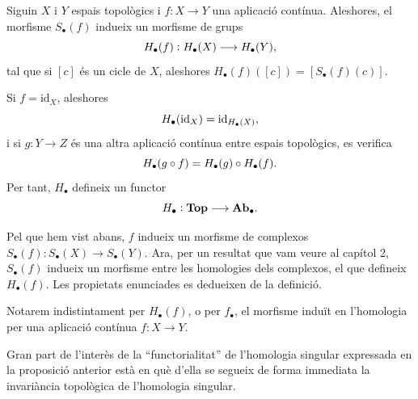\documentclass[../main.tex]{subfiles}
\begin{document}
\begin{prop}
Siguin $X$ i $Y$ espais topològics i $f:X\rightarrow Y$ una aplicació contínua. Aleshores, el morfisme $S_\bullet(f)$ indueix un morfisme de grups
\begin{equation}
    \notag
    H_\bullet(f):H_\bullet(X)\longrightarrow H_\bullet(Y),
\end{equation}
tal que si $[c]$ és un cicle de $X$, aleshores $H_\bullet(f)([c]) = [S_\bullet(f)(c)]$.

Si $f=\mathrm{id}_X$, aleshores
\begin{equation}
    \notag
    H_\bullet(\mathrm{id}_X) = \mathrm{id}_{H_\bullet(X)},
\end{equation}
i si $g:Y\rightarrow Z$ és una altra aplicació contínua entre espais topològics, es verifica
\begin{equation}
    \notag
    H_\bullet(g\circ f) = H_\bullet(g)\circ H_\bullet(f).
\end{equation}
Per tant, $H_\bullet$ defineix un functor
\begin{equation}
    \notag
    H_\bullet:\mathbf{Top}\longrightarrow \mathbf{Ab}_\bullet.
\end{equation}
\end{prop}
\begin{prop}
Pel que hem vist abans, $f$ indueix un morfisme de complexos $S_\bullet(f):S_\bullet(X)\rightarrow S_\bullet(Y)$. Ara, per un resultat que vam veure al capítol 2, $S_\bullet(f)$ indueix un morfisme entre les homologies dels complexos, el que defineix $H_\bullet(f)$. Les propietats enunciades es dedueixen de la definició. 
\end{prop}

Notarem indistintament per $H_\bullet(f)$, o per $f_\bullet$, el morfisme induït en l'homologia per una aplicació contínua $f:X\rightarrow Y$.

Gran part de l'interès de la ``functorialitat'' de l'homologia singular expressada en la proposició anterior està en què d'ella se segueix de forma immediata la invariància topològica de l'homologia singular.
\end{document}
